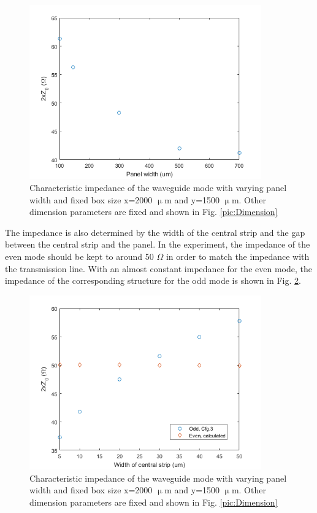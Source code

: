 \documentclass[noshowpacs,amsmath,
superscriptaddress,
10pt]{article}
\begin{document}
\begin{figure}[!ht]
\centering
\includegraphics[width=10cm] {Z_panelW}
\caption{Characteristic impedance of the waveguide mode with varying panel width and fixed box size x=2000 $\upmu$m and y=1500 $\upmu$m. Other dimension parameters are fixed and shown in Fig. \ref{pic:Dimension}}
\label{pic:Z_panelW}
\end{figure}

The impedance is also determined by the width of the central strip and the gap between the central strip and the panel. In the experiment, the impedance of the even mode should be kept to around 50 $\Omega$ in order to match the impedance with the transmission line. With an almost constant impedance for the even mode, the impedance of the corresponding structure for the odd mode is shown in Fig. \ref{pic:Z_cW}.

\begin{figure}[!ht]
\centering
\includegraphics[width=10cm] {Z_cW}
\caption{Characteristic impedance of the waveguide mode with varying panel width and fixed box size x=2000 $\upmu$m and y=1500 $\upmu$m. Other dimension parameters are fixed and shown in Fig. \ref{pic:Dimension}}
\label{pic:Z_cW}
\end{figure}
\end{document}

